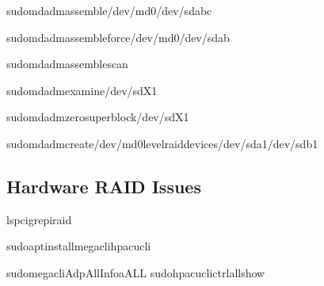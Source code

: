 \documentclass[letterpaper,10pt,english]{sphinxmanual}
\begin{document}
\begin{sphinxVerbatim}[commandchars=\\\{\}]
sudomdadm\PYGZhy{}\PYGZhy{}assemble/dev/md0/dev/sd\PYG{o}{[}abc\PYG{o}{]}

sudomdadm\PYGZhy{}\PYGZhy{}assemble\PYGZhy{}\PYGZhy{}force/dev/md0/dev/sd\PYG{o}{[}ab\PYG{o}{]}

sudomdadm\PYGZhy{}\PYGZhy{}assemble\PYGZhy{}\PYGZhy{}scan
\end{sphinxVerbatim}

\sphinxAtStartPar
{}

\begin{sphinxVerbatim}[commandchars=\\\{\}]
sudomdadm\PYGZhy{}\PYGZhy{}examine/dev/sdX1

sudomdadm\PYGZhy{}\PYGZhy{}zero\PYGZhy{}superblock/dev/sdX1

sudomdadm\PYGZhy{}\PYGZhy{}create/dev/md0\PYGZhy{}\PYGZhy{}level\PYGZhy{}\PYGZhy{}raid\PYGZhy{}devices/dev/sda1/dev/sdb1
\end{sphinxVerbatim}


\subsection{Hardware RAID Issues}
\label{\detokenize{troubleshooting:hardware-raid-issues}}
\sphinxAtStartPar
{}

\begin{sphinxVerbatim}[commandchars=\\\{\}]
lspcigrep\PYGZhy{}iraid

sudoaptinstallmegaclihpacucli

sudomegacli\PYGZhy{}AdpAllInfo\PYGZhy{}aALL
sudohpacuclictrlallshow
\end{sphinxVerbatim}
\end{document}
